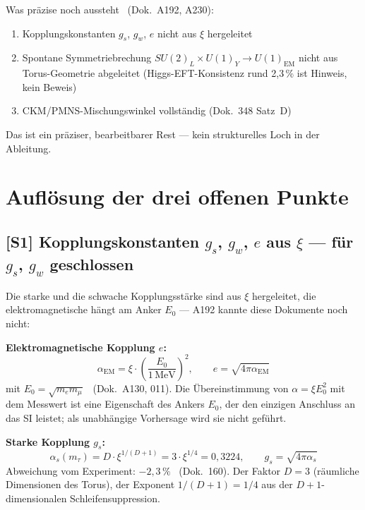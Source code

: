 Was präzise noch aussteht \SM\ (Dok.~A192, A230):
\begin{enumerate}
  \item Kopplungskonstanten $g_s$, $g_w$, $e$ nicht aus $\xi$ hergeleitet
  \item Spontane Symmetriebrechung $SU(2)_L\times U(1)_Y\to U(1)_\text{EM}$
    nicht aus Torus-Geometrie abgeleitet (Higgs-EFT-Konsistenz rund 2,3\,\%
    ist Hinweis, kein Beweis)
  \item CKM/PMNS-Mischungswinkel vollständig (Dok.~348 Satz~D)
\end{enumerate}

Das ist ein präziser, bearbeitbarer Rest --- kein strukturelles Loch in der
Ableitung.

\section{Auflösung der drei offenen Punkte}

\subsection*{[S1] Kopplungskonstanten $g_s$, $g_w$, $e$ aus $\xi$ --- für $g_s$, $g_w$ geschlossen \KM}

Die starke und die schwache Kopplungsstärke sind aus $\xi$ hergeleitet, die
elektromagnetische hängt am Anker $E_0$ --- A192 kannte diese Dokumente noch nicht:

\textbf{Elektromagnetische Kopplung $e$:}
\begin{equation}
  \alpha_\text{EM} = \xi \cdot \left(\frac{E_0}{1\,\text{MeV}}\right)^2,
  \qquad e = \sqrt{4\pi\alpha_\text{EM}}
  \label{eq:alpha_em}
\end{equation}
mit $E_0 = \sqrt{m_e m_\mu}$ \KM\ (Dok.~A130, 011). Die Übereinstimmung von
$\alpha = \xi E_0^2$ mit dem Messwert ist eine Eigenschaft des Ankers $E_0$, der den
einzigen Anschluss an das SI leistet; als unabhängige Vorhersage wird sie nicht
geführt.

\textbf{Starke Kopplung $g_s$:}
\begin{equation}
  \alpha_s(m_\tau) = D\cdot\xi^{1/(D+1)} = 3\cdot\xi^{1/4} = 0{,}3224,
  \qquad g_s = \sqrt{4\pi\alpha_s}
  \label{eq:alpha_s}
\end{equation}
Abweichung vom Experiment: $-2{,}3\,\%$ \KM\ (Dok.~160).
Der Faktor $D=3$ (räumliche Dimensionen des Torus), der Exponent
$1/(D+1)=1/4$ aus der $D+1$-dimensionalen Schleifensuppression.

